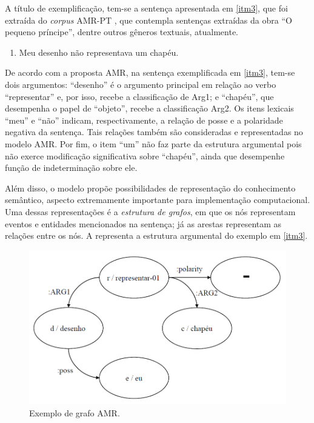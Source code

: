 A título de exemplificação, tem-se a sentença apresentada em \ref{itm3}, que
foi extraída do \emph{corpus} AMR-PT \cite{inacio2023}, que
contempla sentenças extraídas da obra ``O pequeno príncipe'', dentre
outros gêneros textuais, atualmente.

\begin{enumerate}[start=3,label={(\arabic{enumi})}]
    \item\label{itm3} Meu desenho não representava um chapéu.
\end{enumerate}

De acordo com a proposta AMR, na sentença exemplificada em \ref{itm3}, tem-se
dois argumentos: ``desenho'' é o argumento principal em relação ao verbo
``representar'' e, por isso, recebe a classificação de Arg1; e
``chapéu'', que desempenha o papel de ``objeto'', recebe a classificação
Arg2. Os itens lexicais ``meu'' e ``não'' indicam, respectivamente, a
relação de posse e a polaridade negativa da sentença. Tais relações
também são consideradas e representadas no modelo AMR. Por fim, o item
``um'' não faz parte da estrutura argumental pois não exerce modificação
significativa sobre ``chapéu'', ainda que desempenhe função de
indeterminação sobre ele.

Além disso, o modelo propõe possibilidades de representação do
conhecimento semântico, aspecto extremamente importante para
implementação computacional. Uma dessas representações é a
\emph{estrutura de grafos}, em que os nós representam eventos e
entidades mencionados na sentença; já as arestas representam as relações
entre os nós. A  representa a estrutura argumental do exemplo em \ref{itm3}.

\begin{figure}[htpb]
  \centering    
  \begin{minipage}{.75\textwidth}
  \includegraphics[width=\textwidth]{figure01.png}
  \caption{Exemplo de grafo AMR.}
  \label{fig-01}
  \end{minipage}
\end{figure}

